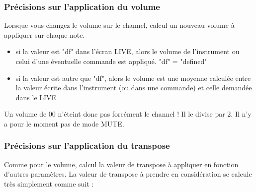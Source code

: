 \subsubsection{Précisions sur l'application du volume}

Lorsque vous changez le volume sur le channel, \FAT calcul un nouveau volume à appliquer sur chaque note.
\medskip

\begin{itemize}
    \item{si la valeur est "df" dans l'écran LIVE, alors le volume de l'instrument ou celui d'une éventuelle commande est appliqué. "df" = "defined"}
    \item{si la valeur est autre que "df", alors le volume est une moyenne calculée entre la valeur écrite dans l'instrument (ou dans une commande) et celle demandée dans le LIVE}
\end{itemize}
\medskip

Un volume de 00 n'éteint donc pas forcément le channel ! Il le divise par 2.
Il n'y a pour le moment pas de mode MUTE.


\subsubsection{Précisions sur l'application du transpose}

Comme pour le volume, \FAT calcul la valeur de transpose à appliquer en fonction d'autres paramètres.
La valeur de transpose à prendre en considération se calcule très simplement comme suit :


